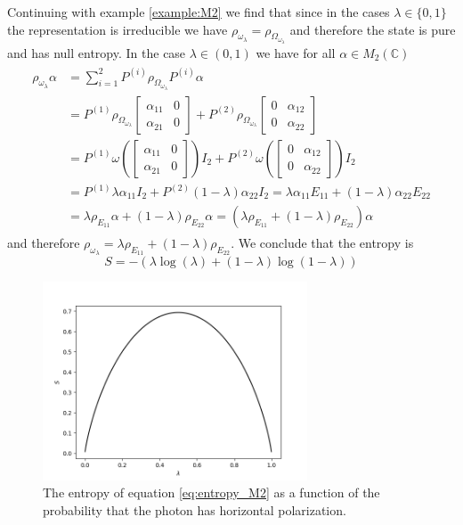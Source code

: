 \begin{example}
Continuing with example \ref{example:M2} we find that since in the cases $\lambda\in\{0,1\}$ the representation is irreducible we have $\rho_{\omega_\lambda}=\rho_{\Omega_{\omega_\lambda}}$ and therefore the state is pure and has null entropy. In the case $\lambda\in (0,1)$ we have for all $\alpha\in M_2(\mathbb{C})$
\begin{align}
\begin{split}
\rho_{\omega_\lambda}\alpha &= \sum_{i=1}^2 P^{(i)}\rho_{\Omega_{\omega_\lambda}}P^{(i)}\alpha \\
& = P^{(1)}\rho_{\Omega_{\omega_\lambda}}\begin{bmatrix}
\alpha_{11} & 0 \\
\alpha_{21} & 0 
\end{bmatrix} + P^{(2)}\rho_{\Omega_{\omega_\lambda}}\begin{bmatrix}
0 & \alpha_{12} \\
0 & \alpha_{22} 
\end{bmatrix} \\
& = P^{(1)}\omega\left(\begin{bmatrix}
\alpha_{11} & 0 \\
\alpha_{21} & 0 
\end{bmatrix} \right)I_2 + P^{(2)}\omega\left(\begin{bmatrix}
0 & \alpha_{12} \\
0 & \alpha_{22} 
\end{bmatrix} \right)I_2 \\
&= P^{(1)}\lambda\alpha_{11}I_2 + P^{(2)}(1-\lambda)\alpha_{22}I_2 =\lambda\alpha_{11} E_{11} + (1-\lambda)\alpha_{22}E_{22} \\
& = \lambda\rho_{E_{11}}\alpha + (1-\lambda)\rho_{E_{22}}\alpha = (\lambda\rho_{E_{11}} + (1-\lambda)\rho_{E_{22}})\alpha
\end{split}
\end{align} 
and therefore $\rho_{\omega_\lambda}=\lambda\rho_{E_{11}} + (1-\lambda)\rho_{E_{22}}$.
We conclude that the entropy is 
\begin{equation}\label{eq:entropy_M2}
S = -(\lambda\log (\lambda) + (1-\lambda)\log(1-\lambda))
\end{equation}
\begin{figure}
\centering
\includegraphics[width=0.7\textwidth]{entropia_M2.png}
\caption{The entropy of equation \ref{eq:entropy_M2} as a function of the probability that the photon has horizontal polarization.}
\end{figure}
\end{example}

